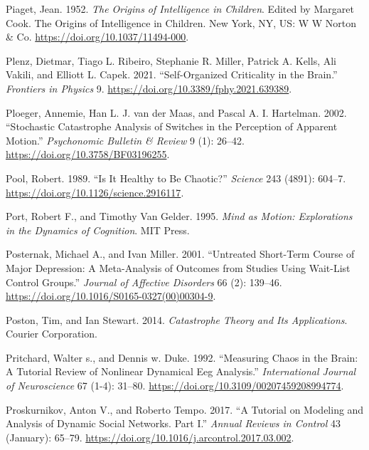 \documentclass[
  a4paper,
  DIV=11,
  numbers=noendperiod,
  oneside]{scrreprt}
\newlength{\cslhangindent}
\newenvironment{CSLReferences}[2] %
 {\begin{list}{}{%
  \setlength{\itemindent}{0pt}
  \setlength{\leftmargin}{0pt}
  \setlength{\parsep}{0pt}
  \ifodd #1
   \setlength{\leftmargin}{\cslhangindent}
   \setlength{\itemindent}{-1\cslhangindent}
  \fi
  \setlength{\itemsep}{#2\baselineskip}}}
 {\end{list}}
\begin{document}
\begin{CSLReferences}{1}{0}
Piaget, Jean. 1952. \emph{The Origins of Intelligence in Children}.
Edited by Margaret Cook. The Origins of Intelligence in Children. {New
York, NY, US}: {W W Norton \& Co}.
\url{https://doi.org/10.1037/11494-000}.

Plenz, Dietmar, Tiago L. Ribeiro, Stephanie R. Miller, Patrick A. Kells,
Ali Vakili, and Elliott L. Capek. 2021. {``Self-{Organized Criticality}
in the {Brain}.''} \emph{Frontiers in Physics} 9.
\url{https://doi.org/10.3389/fphy.2021.639389}.

Ploeger, Annemie, Han L. J. van der Maas, and Pascal A. I. Hartelman.
2002. {``Stochastic Catastrophe Analysis of Switches in the Perception
of Apparent Motion.''} \emph{Psychonomic Bulletin \& Review} 9 (1):
26--42. \url{https://doi.org/10.3758/BF03196255}.

Pool, Robert. 1989. {``Is {It Healthy} to {Be Chaotic}?''}
\emph{Science} 243 (4891): 604--7.
\url{https://doi.org/10.1126/science.2916117}.

Port, Robert F., and Timothy Van Gelder. 1995. \emph{Mind as {Motion}:
{Explorations} in the {Dynamics} of {Cognition}}. {MIT Press}.

Posternak, Michael A., and Ivan Miller. 2001. {``Untreated Short-Term
Course of Major Depression: A Meta-Analysis of Outcomes from Studies
Using Wait-List Control Groups.''} \emph{Journal of Affective Disorders}
66 (2): 139--46. \url{https://doi.org/10.1016/S0165-0327(00)00304-9}.

Poston, Tim, and Ian Stewart. 2014. \emph{Catastrophe {Theory} and {Its
Applications}}. {Courier Corporation}.

Pritchard, Walter s., and Dennis w. Duke. 1992. {``Measuring {Chaos} in
the {Brain}: {A Tutorial Review} of {Nonlinear Dynamical Eeg
Analysis}.''} \emph{International Journal of Neuroscience} 67 (1-4):
31--80. \url{https://doi.org/10.3109/00207459208994774}.

Proskurnikov, Anton V., and Roberto Tempo. 2017. {``A Tutorial on
Modeling and Analysis of Dynamic Social Networks. {Part I}.''}
\emph{Annual Reviews in Control} 43 (January): 65--79.
\url{https://doi.org/10.1016/j.arcontrol.2017.03.002}.


\end{CSLReferences}
\end{document}
